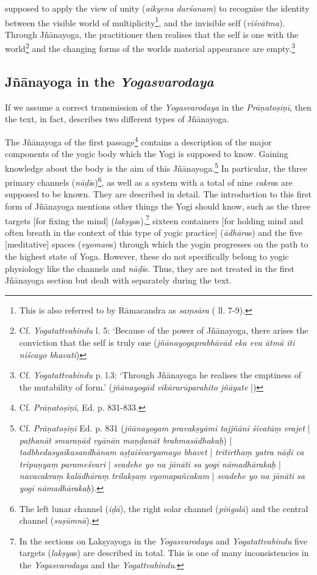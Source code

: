 supposed to apply the view of unity (\textit{aikyena darśanam}) to recognise the identity between the visible world of multiplicity\footnote{This is also referred to by Rāmacandra as \textit{saṃsāra} ( ll. 7-9).}, and the invisible self (\textit{viśvātma}). Through Jñānayoga, the practitioner then realises that the self is one with the world\footnote{Cf. \textit{Yogatattvabindu}  \pageref{svabhava1} l. 5: `Because of the power of Jñānayoga, there arises the conviction that the self is truly one (\textit{jñānayogaprabhāvād eka eva ātmā iti niścayo bhavati})} and the changing forms of the worlds material appearance are empty.\footnote{Cf. \textit{Yogatattvabindu}  p.\pageref{svabhava2} l.3: `Through Jñānayoga he realises the emptiness of the mutability of form.' (\textit{jñānayogād vikārarūparahito jñāyate} |)}

\subsection{Jñānayoga in the \textit{Yogasvarodaya}}
\label{svarodayajnana}
If we assume a correct transmission of the \textit{Yogasvarodaya} in the \textit{Prāṇatoṣiṇī}, then the text, in fact, describes two different types of Jñānayoga. 

The Jñānayoga of the first passage\footnote{Cf. \textit{Prāṇatoṣiṇī}, Ed. p. 831-833.} contains a description of the major components of the yogic body which the Yogi is supposed to know. Gaining knowledge about the body is the aim of this Jñānayoga.\footnote{Cf. \textit{Prāṇatoṣiṇī} Ed. p. 831 (\textit{jñānayogam pravakṣyāmi tajjñānī śivatāṃ vrajet} | \textit{paṭhanāt smaraṇād vyānān maṇḍanāt brahmasādhakaḥ}) | \textit{tadbhedasyaikasandhānam aṣṭaiśvaryamayo bhavet} | \textit{tritīrthaṃ yatra nāḍī ca tripuṇyaṃ parameśvari} | \textit{svadehe yo na jānāti sa yogī nāmadhārakaḥ} | \textit{navacakraṃ kalādhāraṃ trilakṣaṃ vyomapañcakam} | \textit{svadehe yo na jānāti sa yogī nāmadhārakaḥ}).} In particular, the three primary channels (\textit{nāḍī}s)\footnote{The left lunar channel (\textit{iḍā}), the right solar channel (\textit{piṅgalā}) and the central channel (\textit{suṣūmnā}).}, as well as a system with a total of nine \textit{cakra}s are supposed to be known. They are described in detail. The introduction to this first form of Jñānayoga mentions other things the Yogi should know, such as the three targets [for fixing the mind] (\textit{lakṣya}s),\footnote{In the sections on Lakṣyayoga in the \textit{Yogasvarodaya} and \textit{Yogatattvabindu} five targets (\textit{lakṣya}s) are described in total. This is one of many inconsistencies in the \textit{Yogasvarodaya} and the \textit{Yogattvabindu}.} sixteen containers [for holding mind and often breath in the context of this type of yogic practice] (\textit{ādhāra}s) and the five [meditative] spaces (\textit{vyoman}s) through which the yogin progresses on the path to the highest state of Yoga. However, these do not specifically belong to yogic physiology like the channels and \textit{nāḍī}s. Thus, they are not treated in the first Jñānayoga section but dealt with separately during the text.

